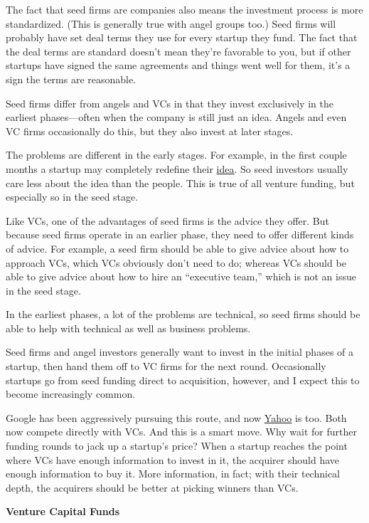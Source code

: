 The fact that seed firms are companies also means the investment process
is more standardized. (This is generally true with angel groups too.)
Seed firms will probably have set deal terms they use for every startup
they fund. The fact that the deal terms are standard doesn't mean
they're favorable to you, but if other startups have signed the same
agreements and things went well for them, it's a sign the terms are
reasonable.

Seed firms differ from angels and VCs in that they invest exclusively in
the earliest phases---often when the company is still just an idea.
Angels and even VC firms occasionally do this, but they also invest at
later stages.

The problems are different in the early stages. For example, in the
first couple months a startup may completely redefine their
\href{ideas.html}{idea}. So seed investors usually care less about the
idea than the people. This is true of all venture funding, but
especially so in the seed stage.

Like VCs, one of the advantages of seed firms is the advice they offer.
But because seed firms operate in an earlier phase, they need to offer
different kinds of advice. For example, a seed firm should be able to
give advice about how to approach VCs, which VCs obviously don't need to
do; whereas VCs should be able to give advice about how to hire an
``executive team,'' which is not an issue in the seed stage.

In the earliest phases, a lot of the problems are technical, so seed
firms should be able to help with technical as well as business
problems.

Seed firms and angel investors generally want to invest in the initial
phases of a startup, then hand them off to VC firms for the next round.
Occasionally startups go from seed funding direct to acquisition,
however, and I expect this to become increasingly common.

Google has been aggressively pursuing this route, and now
\href{http://ycombinator.com/buckman.html}{Yahoo} is too. Both now
compete directly with VCs. And this is a smart move. Why wait for
further funding rounds to jack up a startup's price? When a startup
reaches the point where VCs have enough information to invest in it, the
acquirer should have enough information to buy it. More information, in
fact; with their technical depth, the acquirers should be better at
picking winners than VCs.

\textbf{Venture Capital Funds}

